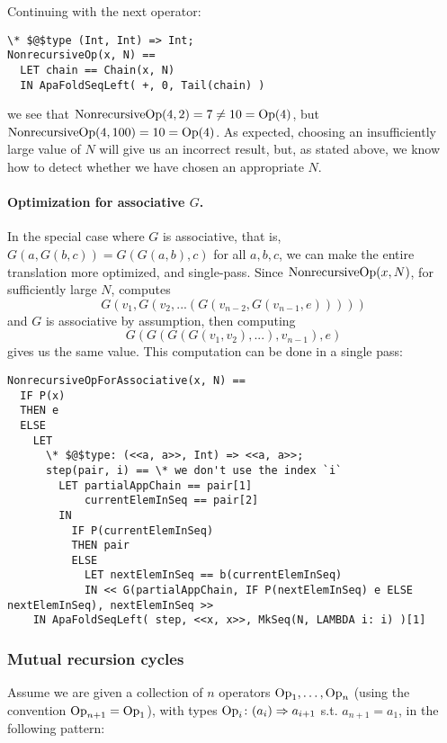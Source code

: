 Continuing with the next operator:
\begin{lstlisting}[language=tla,columns=fullflexible]
\* $@$type (Int, Int) => Int;
NonrecursiveOp(x, N) ==
  LET chain == Chain(x, N)
  IN ApaFoldSeqLeft( +, 0, Tail(chain) )
\end{lstlisting}
%
we see that $\mathrm{NonrecursiveOp}(4, 2) = 7 \ne 10 = \mathrm{Op}(4)$, but $\mathrm{NonrecursiveOp}(4, 100) = 10 = \mathrm{Op}(4)$.
As expected, choosing an insufficiently large value of $N$ will give us an incorrect result, but, as stated above, we know how to detect whether we have chosen an appropriate $N$.

\paragraph{ Optimization for associative $G$.}
In the special case where $G$ is associative, that is, $G(a, G(b, c)) = G(G(a, b), c)$ for all $a,b,c$, we can make the entire translation more optimized, and single-pass. Since $\mathrm{NonrecursiveOp}(x,N)$, for sufficiently large $N$, computes 
\[
G(v_1, G(v_2, ... (G(v_{n-2}, G(v_{n-1}, e)))))
\]
%
and $G$ is associative by assumption, then computing
\[
G(G(G(G(v_1, v_2), ...), v_{n-1}), e)
\]
gives us the same value. This computation can be done in a single pass:
\begin{lstlisting}[language=tla,columns=fullflexible]
NonrecursiveOpForAssociative(x, N) ==
  IF P(x)
  THEN e
  ELSE
    LET 
      \* $@$type: (<<a, a>>, Int) => <<a, a>>;
      step(pair, i) == \* we don't use the index `i`
        LET partialAppChain == pair[1]
            currentElemInSeq == pair[2]
        IN
          IF P(currentElemInSeq)
          THEN pair
          ELSE
            LET nextElemInSeq == b(currentElemInSeq)
            IN << G(partialAppChain, IF P(nextElemInSeq) e ELSE nextElemInSeq), nextElemInSeq >>
    IN ApaFoldSeqLeft( step, <<x, x>>, MkSeq(N, LAMBDA i: i) )[1]
\end{lstlisting}

\subsubsection{ Mutual recursion cycles}

Assume we are given a collection of $n$ operators $\mathrm{Op}_1, \dots, \mathrm{Op}_n$ (using the convention $\mathrm{Op}_{n+1} = \mathrm{Op}_1$), with types $\mathrm{Op}_i\colon (a_i) \Rightarrow a_{i+1}$ s.t. $a_{n+1} = a_1$, in the following pattern:

